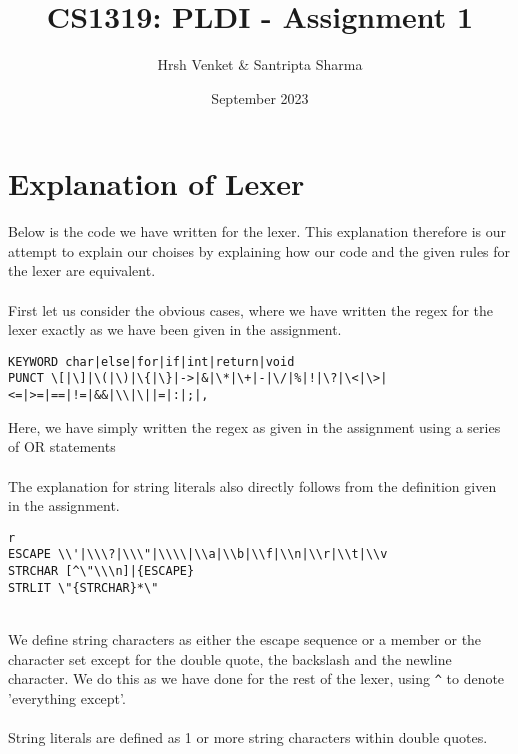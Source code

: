 \documentclass{article}
\title{CS1319: PLDI - Assignment 1}
\author{Hrsh Venket \& Santripta Sharma}
\date{September 2023}
\begin{document}
\maketitle 


\section*{Explanation of Lexer}
Below is the code we have written for the lexer. This explanation therefore is our attempt to explain our choises by explaining how our code and the given rules for the lexer are equivalent.\\
\\
First let us consider the obvious cases, where we have written the regex for the lexer exactly as we have been given in the assignment.
\begin{verbatim}
KEYWORD char|else|for|if|int|return|void
PUNCT \[|\]|\(|\)|\{|\}|->|&|\*|\+|-|\/|%|!|\?|\<|\>|<=|>=|==|!=|&&|\\|\||=|:|;|,
\end{verbatim}
Here, we have simply written the regex as given in the assignment using a series of OR statements\\
\\
The explanation for string literals also directly follows from the definition given in the assignment.
\begin{verbatim}r
ESCAPE \\'|\\\?|\\\"|\\\\|\\a|\\b|\\f|\\n|\\r|\\t|\\v
STRCHAR [^\"\\\n]|{ESCAPE}
STRLIT \"{STRCHAR}*\"
\end{verbatim}\\
We define string characters as either the escape sequence or a member or the character set except for the double quote, the backslash and the newline character. We do this as we have done for the rest of the lexer, using \verb|^| to denote 'everything except'.\\
\\
String literals are defined as 1 or more string characters within double quotes.\\
\end{document}
